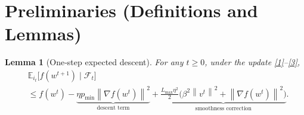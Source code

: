 \documentclass{article}
\newtheorem{lemma}{Lemma}
\newcommand{\E}{\mathbb{E}}
\newcommand{\norm}[1]{\left\|#1\right\|}
\newcommand{\grad}[1]{\nabla #1}
\begin{document}
\section*{Preliminaries (Definitions and Lemmas)}
\begin{lemma}[One‑step expected descent]\label{lem:descent}
For any $t\ge0$, under the update \eqref{1}–\eqref{3},
\[
\begin{aligned}
    &\E_{i_t}\!\bigl[ f(w^{t+1}) \mid \mathcal{F}_{t}\bigr]   \\
    &\le f(w^{t}) - \underbrace{\eta p_{\min}\norm{\grad f(w^{t})}^{2}}_{\text{descent term}}
        +\underbrace{\frac{L_{\max}\eta^{2}}{2}\bigl(\beta^{2}\norm{v^{t}}^{2}+ \norm{\grad f(w^{t})}^{2}\bigr)}_{\text{smoothness correction}} .
\end{aligned}
\tag{6}
\]
\end{lemma}
\end{document}

